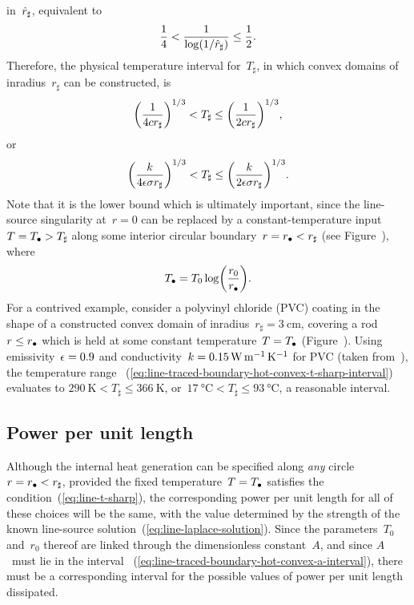 in~$\hat{r}_\sharp$,
equivalent to
\begin{equation}
  \frac{1}{4} < \frac{1}{\log (1 / \hat{r}_\sharp)} \le \frac{1}{2}.
  \label{eq:line-traced-boundary-hot-convex-log-r-sharp-interval}
\end{equation}
Therefore, the physical temperature interval for~$T_\sharp$,
in which convex domains of inradius~$r_\sharp$ can be constructed,
is
\[
  \roundbr*{\frac{1}{4 c r_\sharp}}^{1/3}
    <
  T_\sharp
    \le
  \roundbr*{\frac{1}{2 c r_\sharp}}^{1/3},
\]
or
\begin{equation}
  \roundbr*{\frac{\conduc}{4 \emiss \stefan r_\sharp}}^{1/3}
    <
  T_\sharp
    \le
  \roundbr*{\frac{\conduc}{2 \emiss \stefan r_\sharp}}^{1/3}.
  \label{eq:line-traced-boundary-hot-convex-t-sharp-interval}
\end{equation}
Note that it is the lower bound which is ultimately important,
since the line-source singularity at~$r = 0$
can be replaced by a constant-temperature input~$T = T_\bullet > T_\sharp$
along some interior circular boundary~$r = r_\bullet < r_\sharp$
(see Figure~\tbd),
where
\begin{equation}
  T_\bath = T_0 \log \roundbr*{\frac{r_0}{r_\bath}}.
  \label{eq:line-equivalent-dirichlet-relation}
\end{equation}
For a contrived example,
consider a polyvinyl chloride (PVC) coating
in the shape of a constructed convex domain
of inradius~$r_\sharp = \SI{3}{\centi\metre}$,
covering a rod~$r \le r_\bullet$
which is held at some constant temperature~$T = T_\bullet$
(Figure~\tbd).
Using emissivity~$\epsilon = 0.9$
and conductivity~$k = \SI{0.15}{\watt \per\metre \per\kelvin}$
for PVC (taken from~\tbd),
the temperature range~%
  (\ref{eq:line-traced-boundary-hot-convex-t-sharp-interval})
evaluates to $\SI{290}{\kelvin} < T_\sharp \le \SI{366}{\kelvin}$,
or~$\SI{17}{\degreeCelsius} < T_\sharp \le \SI{93}{\degreeCelsius}$,
a reasonable interval.

\subsection{Power per unit length}
\label{sec:line.physical.power}

Although the internal heat generation can be specified
along \emph{any} circle~$r = r_\bullet < r_\sharp$,
provided the fixed temperature~$T = T_\bullet$
satisfies the condition~(\ref{eq:line-t-sharp}),
the corresponding power per unit length
for all of these choices will be the same,
with the value determined by the strength
of the known line-source solution~(\ref{eq:line-laplace-solution}).
Since the parameters~$T_0$ and~$r_0$ thereof are linked
through the dimensionless constant~$A$,
and since $A$~must lie in the interval~%
  (\ref{eq:line-traced-boundary-hot-convex-a-interval}),
there must be a corresponding interval for the possible values of
power per unit length dissipated.

